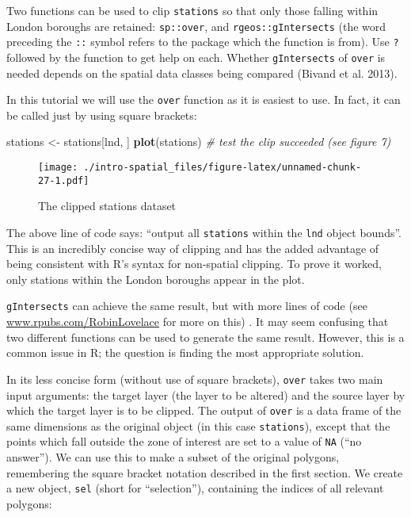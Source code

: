 \documentclass[]{article}
\newenvironment{Shaded}{}{}
\newcommand{\KeywordTok}[1]{\textcolor[rgb]{0.00,0.44,0.13}{\textbf{{#1}}}}
\newcommand{\StringTok}[1]{\textcolor[rgb]{0.25,0.44,0.63}{{#1}}}
\newcommand{\CommentTok}[1]{\textcolor[rgb]{0.38,0.63,0.69}{\textit{{#1}}}}
\newcommand{\NormalTok}[1]{{#1}}
\begin{document}
Two functions can be used to clip \texttt{stations} so that only those
falling within London boroughs are retained: \texttt{sp::over}, and
\texttt{rgeos::gIntersects} (the word preceding the \texttt{::} symbol
refers to the package which the function is from). Use \texttt{?}
followed by the function to get help on each. Whether
\texttt{gIntersects} of \texttt{over} is needed depends on the spatial
data classes being compared (Bivand et al. 2013).

In this tutorial we will use the \texttt{over} function as it is easiest
to use. In fact, it can be called just by using square brackets:

\begin{Shaded}
\begin{Highlighting}[]
\NormalTok{stations <-}\StringTok{ }\NormalTok{stations[lnd, ]}
\KeywordTok{plot}\NormalTok{(stations) }\CommentTok{# test the clip succeeded (see figure 7)}
\end{Highlighting}
\end{Shaded}

\begin{figure}[htbp]
\centering
\texttt{[image: ./intro-spatial\_files/figure-latex/unnamed-chunk-27-1.pdf]}
\caption{The clipped stations dataset}
\end{figure}

The above line of code says: ``output all \texttt{stations} within the
\texttt{lnd} object bounds''. This is an incredibly concise way of
clipping and has the added advantage of being consistent with R's syntax
for non-spatial clipping. To prove it worked, only stations within the
London boroughs appear in the plot.

\texttt{gIntersects} can achieve the same result, but with more lines of
code (see
\href{http://www.rpubs.com/RobinLovelace/11796}{www.rpubs.com/RobinLovelace}
for more on this) . It may seem confusing that two different functions
can be used to generate the same result. However, this is a common issue
in R; the question is finding the most appropriate solution.

In its less concise form (without use of square brackets), \texttt{over}
takes two main input arguments: the target layer (the layer to be
altered) and the source layer by which the target layer is to be
clipped. The output of \texttt{over} is a data frame of the same
dimensions as the original object (in this case \texttt{stations}),
except that the points which fall outside the zone of interest are set
to a value of \texttt{NA} (``no answer''). We can use this to make a
subset of the original polygons, remembering the square bracket notation
described in the first section. We create a new object, \texttt{sel}
(short for ``selection''), containing the indices of all relevant
polygons:
\end{document}
